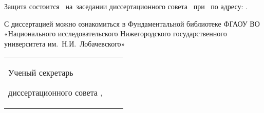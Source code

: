 \noindent Защита состоится 
~на~заседании диссертационного совета ~при ~по адресу: .

\vspace{0.017\paperheight}
\noindent С диссертацией можно ознакомиться в Фундаментальной библиотеке \mbox{ФГАОУ} ВО «Национального исследовательского Нижегородского государственного университета им.~Н.И.~Лобачевского»


\vspace{0.017\paperheight}


\vspace{0.017\paperheight}
\par\bigskip
\noindent%
\begin{tabularx}{\textwidth}{@{}%
>{\raggedright\arraybackslash}b{18em}
>{\centering\arraybackslash}X
r
@{}}
    Ученый секретарь\par
    диссертационного совета ,\par
    &
    &
\end{tabularx} 
